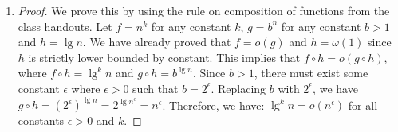 \documentclass[11pt]{article}
\DeclarePairedDelimiter\floor{\lfloor}{\rfloor}
\begin{document}
\begin{enumerate}
\begin{enumerate}
\begin{proof}
  When $c > 0$, let $\floor{c} = k$. By repeatedly using L'Hospital’s
  Rule for $k+1$ times, we get:
  \begin{align}
    \lim_{n\to\infty} \frac{f(n)}{g(n)} = \lim_{n\to\infty}
    \frac{n^c}{b^n} = \lim_{n\to\infty} \frac{c(c-1) \cdots
      (c-k)n^{k-c}}{b^n\ln^{k+1} b} \\ = \frac{c(c-1) \cdots
      (c-k)}{\ln^{k+1} b}\lim_{n\to\infty} \frac{n^{k-c}}{b^n}
  \end{align}
  Since $k-c < 0$, we have $\lim_{n\to\infty} \frac{n^{k-c}}{b^n} =
  0$. Thus:
  \begin{align}
    \lim_{n\to\infty} \frac{f(n)}{g(n)} = \frac{c(c-1) \cdots
      (c-k)}{\ln^{k+1} b}\lim_{n\to\infty} \frac{n^{k-c}}{b^n} \\ =
    \frac{c(c-1) \cdots (c-k)}{\ln^{k+1} b} \times 0 = 0
  \end{align}

  Thus, $n^c = o(b^n)$ when $c > 0$. 

  Therefore, for all constants $b$
  and $c$ with $b>1$, we know that $n^c = o(b^n)$.
\end{proof}

\item \begin{proof}
  We prove this by using the rule on composition of functions from the
  class handouts. Let $f=n^k$ for any constant $k$, $g=b^n$ for
  any constant $b>1$ and $h=\lg n$. We have already proved that $f=o(g)$
  and $h=\omega(1)$ since $h$ is strictly lower bounded by constant. This
  implies that $f \circ h = o(g \circ h)$, where $f \circ h = \lg^k n$
  and $g \circ h = b^{\lg n}$. Since $b>1$, there must exist some
  constant $\epsilon$ where $\epsilon > 0$ such that $b =
  2^\epsilon$. Replacing $b$ with $2^\epsilon$, we have $g \circ h =
  (2^\epsilon)^{\lg n} = 2^{\lg n^\epsilon} = n^\epsilon$. Therefore,
  we have: $\lg^k n = o(n^\epsilon)$ for all constants
  $\epsilon > 0$ and $k$. 
\end{proof}
\end{enumerate}


\end{enumerate}
\end{document}
